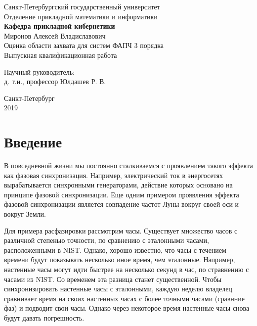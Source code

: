 \documentclass[a4paper,14pt]{extarticle} %
\begin{document}


 
\begin{center}
\hfill \break
\normalsize{Санкт-Петербургский государственный университет}\\ 
\hfill \break
\normalsize{Отделение прикладной математики и информатики}\\
\normalsize{\textbf{Кафедра прикладной кибернетики}}\\
\hfill \break
\hfill \break 
\hfill \break
\hfill \break
\hfill\break
\hfill \break
\normalsize{Миронов Алексей Владиславович}\\
\hfill \break
\large{Оценка области захвата для систем ФАПЧ 3 порядка}\\
\hfill \break
\small{Выпускная квалификационная работа}\\
\hfill \break
\hfill \break
\hfill \break
\hfill \break
\hfill \break
\hfill \break
\hfill \break
\hfill \break
\end{center}
 
\hfill \break
\hfill \break
\hfill \break
 
 \small{
\begin{flushright}
Научный руководитель:\\
д. т.н., профессор Юлдашев Р. В.
\end{flushright}
}
\hfill \break
\hfill \break
\hfill \break
\hfill \break
\hfill \break
\hfill \break
\hfill \break
\hfill \break
\hfill \break
\hfill \break
\hfill \break
\hfill \break
\hfill \break
\begin{center} Санкт-Петербург \\
2019 \end{center}
\thispagestyle{empty} %

 \tableofcontents
\newpage
\section{Введение}
В повседневной жизни мы постоянно сталкиваемся с проявлением такого эффекта как фазовая синхронизация. Например, электрический ток в энергосетях вырабатывается синхронными  генераторами, действие которых основано на принципе фазовой синхронизации. Еще одним примером проявления эффекта фазовой синхронизации является совпадение частот Луны вокруг своей оси и вокруг Земли.

 Для примера расфазировки рассмотрим часы. Существует множество часов с различной степенью точности, по сравнению с эталонными часами, расположенными в NIST. Однако, хорошо известно, что часы с течением времени будут показывать несколько иное время, чем эталонные. Например, настенные часы могут идти быстрее на несколько секунд в час, по стравнению с часами из NIST. Со временем эта разница станет существенной. Чтобы синхронизировать настенные часы с эталонными, каждую неделю владелец сравнивает время на своих настенных часах с более точными часами (сравнние фаз) и подводит свои часы. Однако через некоторое время настенные часы снова будут давать погрешность.
 
\end{document}
